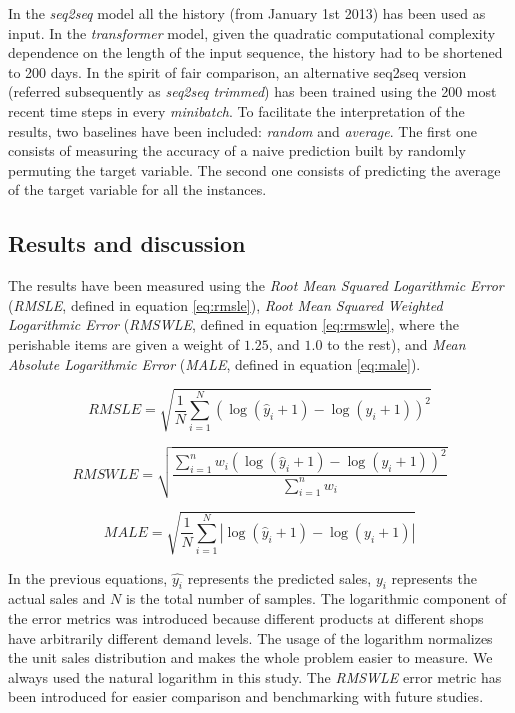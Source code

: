 In the \textit{seq2seq} model all the history (from January 1st 2013) has been used as input.  In the \textit{transformer} model, given the quadratic computational complexity dependence on the length of the input sequence, the history had to be shortened to 200 days. In the spirit of fair comparison, an alternative seq2seq version (referred subsequently as \textit{seq2seq trimmed}) has been trained using the 200 most recent time steps in every \textit{minibatch}. To facilitate the interpretation of the results, two baselines have been included: \textit{random} and \textit{average}. The first one consists of measuring the accuracy of a naive prediction built by randomly permuting the target variable. The second one consists of predicting the average of the target variable for all the instances.

\subsection{Results and discussion}

The results have been measured using the \textit{Root Mean Squared Logarithmic Error} (\textit{RMSLE}, defined in equation \ref{eq:rmsle}), \textit{Root Mean Squared Weighted Logarithmic Error} (\textit{RMSWLE}, defined in equation \ref{eq:rmswle}, where the perishable items are given a weight of $1.25$, and $1.0$ to the rest),  and \textit{Mean Absolute Logarithmic Error} (\textit{MALE}, defined in equation \ref{eq:male}).

\begin{equation} \label{eq:rmsle}
RMSLE = \sqrt{ \frac{1}{N} \displaystyle\sum_{i=1}^N  \left(\log(\hat{y}_i + 1) - \log(y_i +1)  \right)^2  }
\end{equation}

\begin{equation} \label{eq:rmswle}
RMSWLE = \sqrt{ \frac{\displaystyle\sum_{i=1}^n w_i \left( \log(\hat{y}_i + 1) - \log(y_i +1)  \right)^2  }{\displaystyle\sum_{i=1}^n w_i}}
\end{equation}

\begin{equation} \label{eq:male}
MALE = \sqrt{ \frac{1}{N} \displaystyle\sum_{i=1}^N  \left|\log(\hat{y}_i + 1) - \log(y_i +1)  \right|  }
\end{equation}


In the previous equations, $\hat{y_i}$ represents the predicted sales,  $y_i$ represents the actual sales and $N$ is the total number of samples. The logarithmic component of the error metrics was introduced because different products at different shops have arbitrarily different demand levels. The usage of the logarithm normalizes the unit sales distribution and makes the whole problem easier to measure.  We always used the natural logarithm in this study. The \textit{RMSWLE} error metric has been introduced for easier comparison and benchmarking with future studies.

